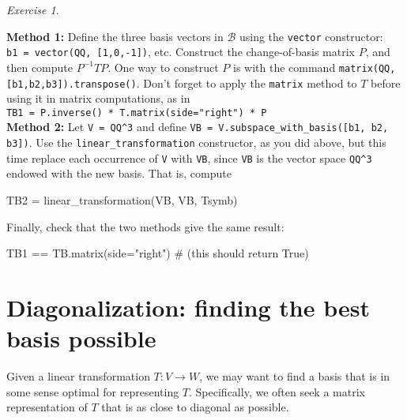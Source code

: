 \documentclass[fleqn,11pt]{paper}
\theoremstyle{remark}
\newtheorem{exercise}{Exercise}
\newcommand{\<}{\ensuremath{\langle}}
\renewcommand{\>}{\ensuremath{\rangle}}
\newcommand\sB{\ensuremath{\mathcal B}}
\begin{document}
\begin{exercise}
\begin{enumerate}[(a)]
  {\bf Method 1:} 
  Define the three basis vectors in $\sB$ using the \verb!vector! constructor:  \\
  \verb!b1 = vector(QQ, [1,0,-1])!, etc.
  Construct the change-of-basis matrix $P$, and then 
  compute $P^{-1} T P$. One way to construct $P$ is with the command
  \verb!matrix(QQ, [b1,b2,b3]).transpose()!.
  Don't forget to apply the \verb!matrix! method to $T$ before using it in matrix computations, as in\\
  \verb!TB1 = P.inverse() * T.matrix(side="right") * P!
  \\[5pt]
  {\bf Method 2:}
  Let \verb!V = QQ^3! and
  define \verb!VB = V.subspace_with_basis([b1, b2, b3])!.
  Use the \verb!linear_transformation! constructor, as you did above, but this time
  replace each occurrence of \verb!V!
  with \verb!VB!, since \verb!VB! is the vector space \verb!QQ^3! endowed with the new basis.
  That is, compute 
  \begin{sageblock}
   TB2 = linear_transformation(VB, VB, Tsymb)
  \end{sageblock}
  Finally, check that the two methods give the same result:
  \begin{sageblock}
    TB1 == TB.matrix(side="right")      # (this should return True)
  \end{sageblock}

  
  \end{enumerate}
\end{exercise}

\section{Diagonalization: finding the best basis possible}
Given a linear transformation $T: V \to W$, we may want to find a basis that is 
in some sense optimal for representing $T$. Specifically, we often  seek a matrix
representation of $T$ that is as close to diagonal as possible.
\end{document}
